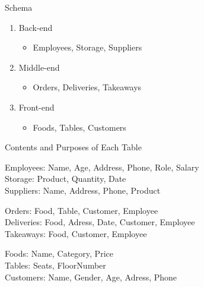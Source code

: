 \documentclass[14pt, c]{beamer}
\begin{document}
\begin{frame}[label=sec-1-3]{Schema}
\pause
\begin{block}{}
\begin{enumerate}
\item Back-end
\begin{itemize}
\item Employees, Storage, Suppliers\pause
\end{itemize}
\item Middle-end
\begin{itemize}
\item Orders, Deliveries, Takeaways\pause
\end{itemize}
\item Front-end
\begin{itemize}
\item Foods, Tables, Customers
\end{itemize}
\end{enumerate}
\end{block}
\end{frame}

\begin{frame}[label=sec-1-4]{Contents and Purposes of Each Table}
\pause
\begin{block}{}
\small{}
\alert{Employees}: Name, Age, Address, Phone, Role, Salary\\
\alert{Storage}: Product, Quantity, Date\\
\alert{Suppliers}: Name, Address, Phone, Product\pause
\end{block}
\begin{block}{}
\small{}
\alert{Orders}: Food, Table, Customer, Employee\\
\alert{Deliveries}: Food, Adress, Date, Customer, Employee\\
\alert{Takeaways}: Food, Customer, Employee\pause
\end{block}
\begin{block}{}
\small{}
\alert{Foods}: Name, Category, Price\\
\alert{Tables}: Seats, FloorNumber\\
\alert{Customers}: Name, Gender, Age, Adress, Phone
\end{block}
\end{frame}
\end{document}
